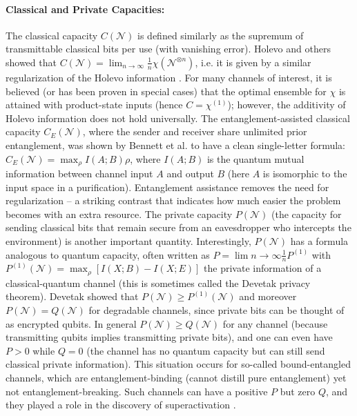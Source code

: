 \documentclass[11pt]{article}
\theoremstyle{plain}
\theoremstyle{definition}
\numberwithin{equation}{section}
\begin{document}
\paragraph{Classical and Private Capacities:} 
The classical capacity $C(\mathcal{N})$ is defined similarly as the supremum of transmittable classical bits per use (with vanishing error). Holevo and others showed that $C(\mathcal{N}) = \lim_{n\to\infty}\frac{1}{n} \chi(\mathcal{N}^{\otimes n})$, i.e. it is given by a similar regularization of the Holevo information \cite{33}. For many channels of interest, it is believed (or has been proven in special cases) that the optimal ensemble for $\chi$ is attained with product-state inputs (hence $C = \chi^{(1)}$); however, the additivity of Holevo information does not hold universally. The entanglement-assisted classical capacity $C_E(\mathcal{N})$, where the sender and receiver share unlimited prior entanglement, was shown by Bennett et al. to have a clean single-letter formula: $C_E(\mathcal{N}) = \max_{\rho} I(A;B){\rho}$, where $I(A;B)$ is the quantum mutual information between channel input $A$ and output $B$ (here $A$ is isomorphic to the input space in a purification). Entanglement assistance removes the need for regularization – a striking contrast that indicates how much easier the problem becomes with an extra resource. The private capacity $P(\mathcal{N})$ (the capacity for sending classical bits that remain secure from an eavesdropper who intercepts the environment) is another important quantity. Interestingly, $P(\mathcal{N})$ has a formula analogous to quantum capacity, often written as $P = \lim{n\to\infty}\frac{1}{n} P^{(1)}$ with $P^{(1)}(\mathcal{N}) = \max_{\rho} [I(X;B) - I(X;E)]$ the private information of a classical-quantum channel (this is sometimes called the Devetak privacy theorem). Devetak showed that $P(\mathcal{N}) \ge P^{(1)}(\mathcal{N})$ and moreover $P(\mathcal{N}) = Q(\mathcal{N})$ for degradable channels, since private bits can be thought of as encrypted qubits\cite{55}. In general $P(\mathcal{N}) \ge Q(\mathcal{N})$ for any channel (because transmitting qubits implies transmitting private bits), and one can even have $P > 0$ while $Q=0$ (the channel has no quantum capacity but can still send classical private information). This situation occurs for so-called bound-entangled channels, which are entanglement-binding (cannot distill pure entanglement) yet not entanglement-breaking. Such channels can have a positive $P$ but zero $Q$, and they played a role in the discovery of superactivation \cite{88}.
\end{document}
